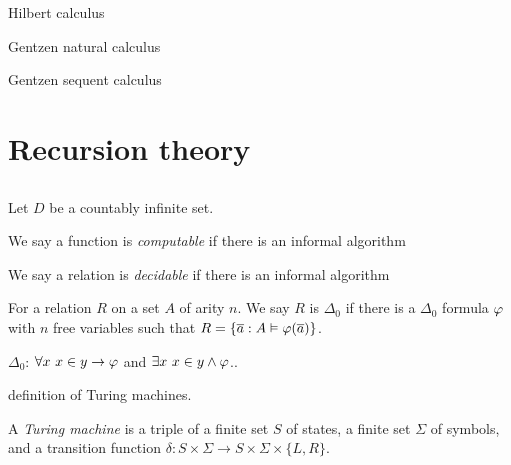 \documentclass{../../large}
\begin{document}
Hilbert calculus

Gentzen natural calculus

Gentzen sequent calculus


\part{Recursion theory}
\chapter{}
Let $D$ be a countably infinite set.



We say a function is \emph{computable} if there is an informal algorithm 

We say a relation is \emph{decidable} if there is an informal algorithm



For a relation $R$ on a set $A$ of arity $n$.
We say $R$ is $\Delta_0$ if there is a $\Delta_0$ formula $\varphi$ with $n$ free variables such that $R=\{\overline a:A\vDash\varphi(\overline a)\}$.

$\Delta_0$: $\forall x\ x\in y\to\varphi$ and $\exists x\ x\in y\wedge\varphi$..



definition of Turing machines.

A \emph{Turing machine} is a triple of a finite set $S$ of states, a finite set $\Sigma$ of symbols, and a transition function $\delta:S\times\Sigma\to S\times\Sigma\times\{L,R\}$.
\end{document}
